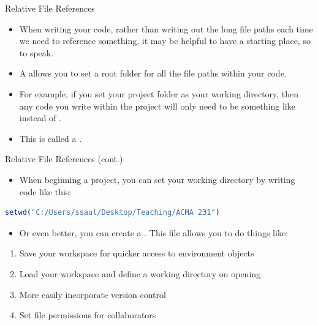 \begin{frame}{Relative File References}
\begin{itemize}
  \item When writing your code, rather than writing out the long file paths each time we need to reference something, it may be helpful to have a starting place, so to speak.
  \item A  allows you to set a root folder for all the file paths within your code.
  \item For example, if you set your project folder as your working directory, then any code you write within the project will only need to be something like  instead of .
  \item This is called a .
\end{itemize}
\end{frame}

\begin{frame}[fragile]{Relative File References (cont.)}
\begin{itemize}
  \item When beginning a project, you can set your working directory by writing code like this:
\end{itemize}
\begin{lstlisting}[language=R]
setwd("C:/Users/ssaul/Desktop/Teaching/ACMA 231")
\end{lstlisting}
\begin{itemize}
  \item Or even better, you can create a . This file allows you to do things like:
\end{itemize}
\begin{enumerate}
  \item Save your workspace for quicker access to environment objects
  \item Load your workspace and define a working directory on opening
  \item More easily incorporate version control
  \item Set file permissions for collaborators
\end{enumerate}
\end{frame}

